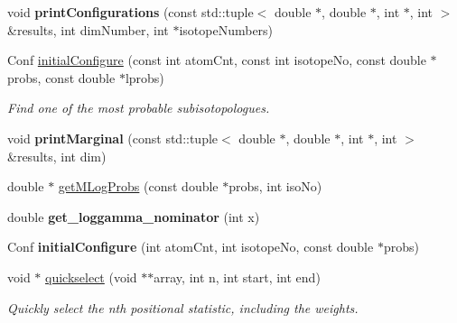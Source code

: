 \begin{DoxyCompactItemize}
\item 
\mbox{\label{namespace_iso_spec_a8c0ac7d2f8818b2f4e66b40cf15aebe5}} 
void {\bfseries print\+Configurations} (const std\+::tuple$<$ double $\ast$, double $\ast$, int $\ast$, int $>$ \&results, int dim\+Number, int $\ast$isotope\+Numbers)
\item 
Conf \mbox{\hyperlink{namespace_iso_spec_a9abbd881dd3c9347438361a6dd21cef4}{initial\+Configure}} (const int atom\+Cnt, const int isotope\+No, const double $\ast$probs, const double $\ast$lprobs)
\begin{DoxyCompactList}\small\item\em Find one of the most probable subisotopologues. \end{DoxyCompactList}\item 
\mbox{\label{namespace_iso_spec_a90a5da54d5272c212ed36f4117939343}} 
void {\bfseries print\+Marginal} (const std\+::tuple$<$ double $\ast$, double $\ast$, int $\ast$, int $>$ \&results, int dim)
\item 
double $\ast$ \mbox{\hyperlink{namespace_iso_spec_a4b68cc6e2f1f4f30b189a5d01153daa4}{get\+M\+Log\+Probs}} (const double $\ast$probs, int iso\+No)
\item 
\mbox{\label{namespace_iso_spec_a01f8cd14080a2713f6e83e9f46322277}} 
double {\bfseries get\+\_\+loggamma\+\_\+nominator} (int x)
\item 
\mbox{\label{namespace_iso_spec_a4e0e801604398f617d64e6822bbc4e03}} 
Conf {\bfseries initial\+Configure} (int atom\+Cnt, int isotope\+No, const double $\ast$probs)
\item 
\mbox{\label{namespace_iso_spec_acbcd0253dcdabd90c53d008c7e12b95f}} 
void $\ast$ \mbox{\hyperlink{namespace_iso_spec_acbcd0253dcdabd90c53d008c7e12b95f}{quickselect}} (void $\ast$$\ast$array, int n, int start, int end)
\begin{DoxyCompactList}\small\item\em Quickly select the n\textquotesingle{}th positional statistic, including the weights. \end{DoxyCompactList}\item 
\mbox{\label{namespace_iso_spec_a79a88e35ec43cb5066675948fec030cd}} 
$$
\end{DoxyCompactItemize}
